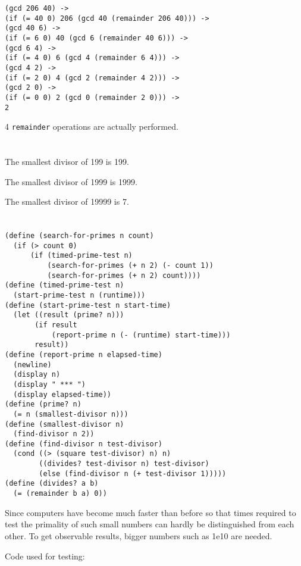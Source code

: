 \documentclass[a4paper]{report}
\begin{document}
\begin{lstlisting}
(gcd 206 40) ->
(if (= 40 0) 206 (gcd 40 (remainder 206 40))) ->
(gcd 40 6) ->
(if (= 6 0) 40 (gcd 6 (remainder 40 6))) ->
(gcd 6 4) ->
(if (= 4 0) 6 (gcd 4 (remainder 6 4))) ->
(gcd 4 2) ->
(if (= 2 0) 4 (gcd 2 (remainder 4 2))) ->
(gcd 2 0) ->
(if (= 0 0) 2 (gcd 0 (remainder 2 0))) ->
2
\end{lstlisting}

4 \lstinline{remainder} operations are actually performed.


\section{}

The smallest divisor of 199 is 199.

The smallest divisor of 1999 is 1999.

The smallest divisor of 19999 is 7.


\section{}

\begin{lstlisting}
(define (search-for-primes n count)
  (if (> count 0)
      (if (timed-prime-test n)
          (search-for-primes (+ n 2) (- count 1))
          (search-for-primes (+ n 2) count))))
(define (timed-prime-test n)
  (start-prime-test n (runtime)))
(define (start-prime-test n start-time)
  (let ((result (prime? n)))
       (if result
           (report-prime n (- (runtime) start-time)))
       result))
(define (report-prime n elapsed-time)
  (newline)
  (display n)
  (display " *** ")
  (display elapsed-time))
(define (prime? n)
  (= n (smallest-divisor n)))
(define (smallest-divisor n)
  (find-divisor n 2))
(define (find-divisor n test-divisor)
  (cond ((> (square test-divisor) n) n)
        ((divides? test-divisor n) test-divisor)
        (else (find-divisor n (+ test-divisor 1)))))
(define (divides? a b)
  (= (remainder b a) 0))
\end{lstlisting}

Since computers have become much faster than before so that
 times required to test the primality of such small numbers
 can hardly be distinguished from each other. To get observable
 results, bigger numbers such as 1e10 are needed.

Code used for testing:
\end{document}
